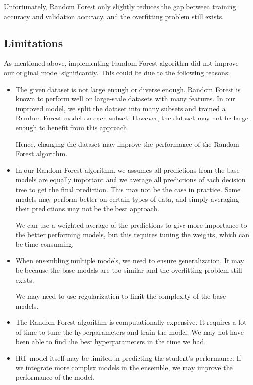 \documentclass{article}
\begin{document}
Unfortunately, Random Forest only slightly reduces the gap between training accuracy and validation accuracy, and the overfitting problem still exists.

\subsection*{Limitations}

As mentioned above, implementing Random Forest algorithm did not improve our original model significantly. This could be due to the following reasons:
\begin{itemize}
    \item The given dataset is not large enough or diverse enough. Random Forest is known to perform well on large-scale datasets with many features. In our improved model, we split the dataset into many subsets and trained a Random Forest model on each subset. However, the dataset may not be large enough to benefit from this approach.
    
    Hence, changing the dataset may improve the performance of the Random Forest algorithm.
    
    \item In our Random Forest algorithm, we assumes all predictions from the base models are equally important and we average all predictions of each decision tree to get the final prediction. This may not be the case in practice. Some models may perform better on certain types of data, and simply averaging their predictions may not be the best approach.
    
    We can use a weighted average of the predictions to give more importance to the better performing models, but this requires tuning the weights, which can be time-consuming.

    \item When ensembling multiple models, we need to ensure generalization. It may be because the base models are too similar and the overfitting problem still exists.
    
    We may need to use regularization to limit the complexity of the base models.
   
    \item The Random Forest algorithm is computationally expensive. It requires a lot of time to tune the hyperparameters and train the model. We may not have been able to find the best hyperparameters in the time we had.
   
    \item IRT model itself may be limited in predicting the student's performance. If we integrate more complex models in the ensemble, we may improve the performance of the model.
\end{itemize}
\end{document}
